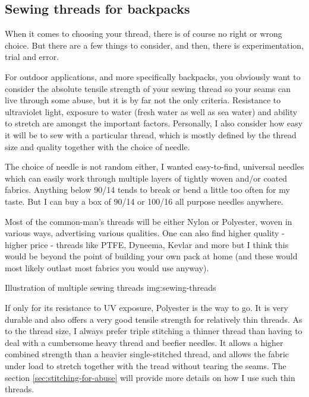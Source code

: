 \subsection{Sewing threads for backpacks} \label{sec:sewing-thread}

When it comes to choosing your thread, there is of course no right or wrong choice. But there are a few things to consider, and then, there is experimentation, trial and error.

For outdoor applications, and more specifically backpacks, you obviously want to consider the absolute tensile strength of your sewing thread so your seams can live through some abuse, but it is by far not the only criteria. Resistance to ultraviolet light, exposure to water (fresh water as well as sea water) and ability to stretch are amongst the important factors. Personally, I also consider how easy it will be to sew with a particular thread, which is mostly defined by the thread size and quality together with the choice of needle.

\begin{note}
  The choice of needle is not random either, I wanted easy-to-find, universal needles which can easily work through multiple layers of tightly woven and/or coated fabrics. Anything below 90/14 tends to break or bend a little too often for my taste. But I can buy a box of 90/14 or 100/16 all purpose needles anywhere.
\end{note}

Most of the common-man's threads will be either Nylon or Polyester, woven in various ways, advertising various qualities. One can also find higher quality - higher price - threads like PTFE, Dyneema, Kevlar and more but I think this would be beyond the point of building your own pack at home (and these would most likely outlast most fabrics you would use anyway).

{Illustration of multiple sewing threads}
{img:sewing-threads}

If only for its resistance to UV exposure, Polyester is the way to go. It is very durable and also offers a very good tensile strength for relatively thin threads. As to the thread size, I always prefer triple stitching a thinner thread than having to deal with a cumbersome heavy thread and beefier needles. It allows a higher combined strength than a heavier single-stitched thread, and allows the fabric under load to stretch together with the tread without tearing the seams. The section \ref{sec:stitching-for-abuse} will provide more details on how I use such thin threads.

